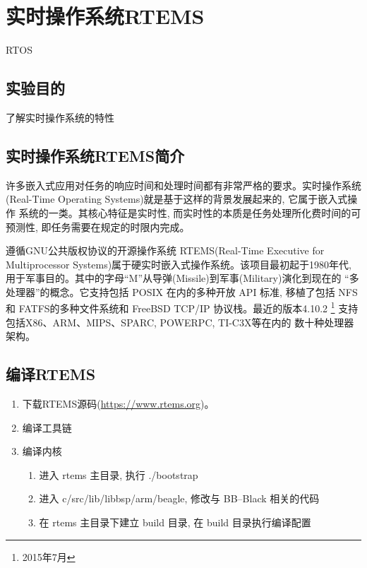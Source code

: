\chapter{实时操作系统RTEMS}{RTOS}

\section{实验目的}
了解实时操作系统的特性

\section{实时操作系统RTEMS简介}
许多嵌入式应用对任务的响应时间和处理时间都有非常严格的要求。实时操作系统
(Real-Time Operating Systems)就是基于这样的背景发展起来的, 它属于嵌入式操作
系统的一类。其核心特征是实时性, 而实时性的本质是任务处理所化费时间的可预测性,
即任务需要在规定的时限内完成。

遵循GNU公共版权协议的开源操作系统 RTEMS(Real-Time Executive for
Multiprocessor Systems)属于硬实时嵌入式操作系统。该项目最初起于1980年代,
用于军事目的。其中的字母``M''从导弹(Missile)到军事(Military)演化到现在的
``多处理器''的概念。它支持包括 POSIX 在内的多种开放 API 标准, 移植了包括
NFS和 FATFS的多种文件系统和 FreeBSD TCP/IP 协议栈。最近的版本4.10.2
\footnote{2015年7月} 支持包括X86、ARM、MIPS、SPARC, POWERPC, TI-C3X等在内的
数十种处理器架构。

\section{编译RTEMS}
\begin{enumerate}
    \item 下载RTEMS源码(\url{https://www.rtems.org})。
    \item 编译工具链
    \item 编译内核
    \begin{enumerate}
        \item 进入 rtems 主目录, 执行 ./bootstrap
	    \item 进入 c/src/lib/libbsp/arm/beagle, 修改与 BB--Black 相关的代码
	    \item 在 rtems 主目录下建立 build 目录, 在 build 目录执行编译配置
    \end{enumerate}
\end{enumerate}

